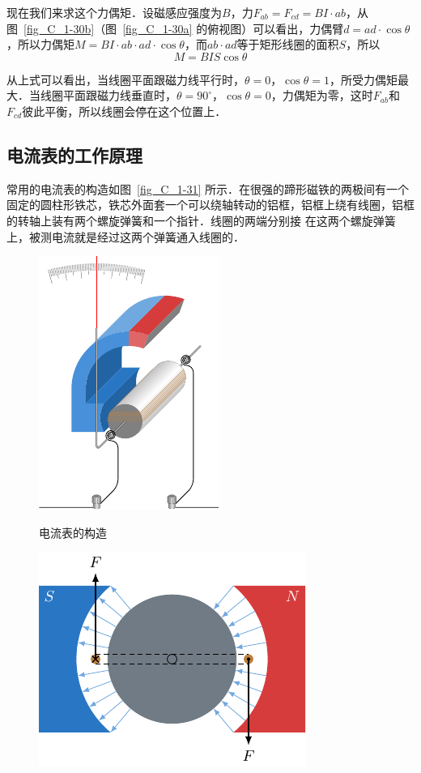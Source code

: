 现在我们来求这个力偶矩．设磁感应强度为$B$，力$F_{ab}=
F_{cd}=BI·ab$，从图~\ref{fig_C_1-30b}（图~\ref{fig_C_1-30a} 的俯视图）可以看出，力偶臂$d=ad\cdot \cos\theta$，所以力偶矩$M=BI\cdot ab\cdot ad\cdot \cos\theta$，而$ab\cdot ad$等于矩形线圈的面积$S$，所以$$M=BIS\cos\theta$$

从上式可以看出，当线圈平面跟磁力线平行时，$\theta=0$，$\cos\theta=1$，所受力偶矩最大．当线圈平面跟磁力线垂直时，$\theta=90^{\circ}$，$\cos\theta=0$，力偶矩为零，这时$F_{ab}$和$F_{cd}$彼此平衡，所以线圈会停在这个位置上．

\subsection{电流表的工作原理}

常用的电流表的构造如图~\ref{fig_C_1-31} 所示．在很强的蹄形磁铁的两极间有一个固定的圆柱形铁芯，铁芯外面套一个可以绕轴转动的铝框，铝框上绕有线圈，铝框的转轴上装有两个螺旋弹簧和一个指针．线圈的两端分别接
在这两个螺旋弹簧上，被测电流就是经过这两个弹簧通入线圈的．
\begin{figure}[htbp]
    \centering
    \begin{minipage}[t]{0.48\textwidth}
        \centering
        \includegraphics{fig/C/1-31.pdf}
        \caption{电流表的构造}\label{fig_C_1-31}
    \end{minipage}
    \begin{minipage}[t]{0.48\textwidth}
        \centering
        \includegraphics{fig/C/1-32.pdf}
        \caption{}\label{fig_C_1-32}
    \end{minipage}
\end{figure}


